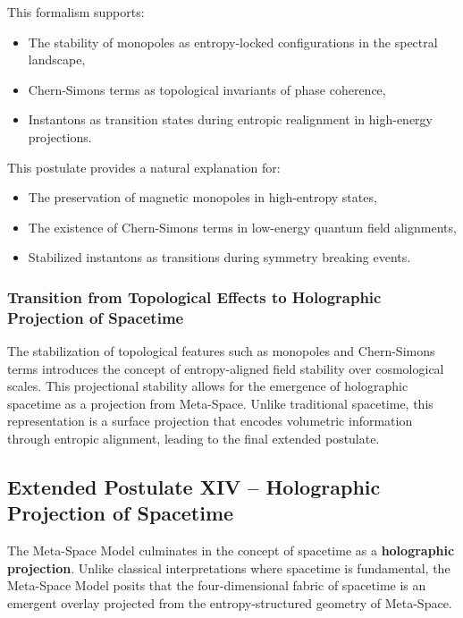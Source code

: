 \documentclass[10.5pt,a4paper]{article}
\begin{document}
This formalism supports:
\begin{itemize}
    \item The stability of monopoles as entropy-locked configurations in the spectral landscape,
    \item Chern-Simons terms as topological invariants of phase coherence,
    \item Instantons as transition states during entropic realignment in high-energy projections.
\end{itemize}

This postulate provides a natural explanation for:
\begin{itemize}
    \item The preservation of magnetic monopoles in high-entropy states,
    \item The existence of Chern-Simons terms in low-energy quantum field alignments,
    \item Stabilized instantons as transitions during symmetry breaking events.
\end{itemize}

\subsubsection*{Transition from Topological Effects to Holographic Projection of Spacetime}

The stabilization of topological features such as monopoles and Chern-Simons terms introduces the concept of 
entropy-aligned field stability over cosmological scales. This projectional stability allows for the emergence 
of holographic spacetime as a projection from Meta-Space. Unlike traditional spacetime, this representation 
is a surface projection that encodes volumetric information through entropic alignment, leading to the final 
extended postulate.

\subsection{Extended Postulate XIV – Holographic Projection of Spacetime}

The Meta-Space Model culminates in the concept of spacetime as a \textbf{holographic projection}. 
Unlike classical interpretations where spacetime is fundamental, the Meta-Space Model posits that the four-dimensional 
fabric of spacetime is an emergent overlay projected from the entropy-structured geometry of Meta-Space.
\end{document}
